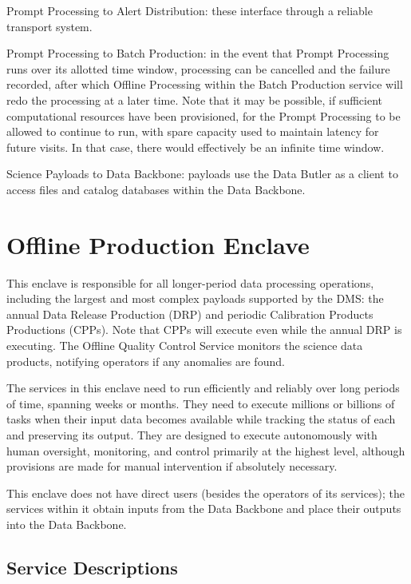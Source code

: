\documentclass[DM,toc,lsstdraft]{lsstdoc}
\begin{document}
Prompt Processing to Alert Distribution: these
interface through a reliable transport system.

Prompt Processing to Batch Production: in the event that Prompt
Processing runs over its allotted time window, processing can be
cancelled and the failure recorded, after which Offline Processing within
the Batch Production service will
redo the processing at a later time. Note that it may be possible, if
sufficient computational resources have been provisioned, for the Prompt
Processing to be allowed to continue to run, with spare capacity used to
maintain latency for future visits. In that case, there would
effectively be an infinite time window.

Science Payloads to Data Backbone: payloads use the Data Butler as a
client to access files and catalog databases within the Data Backbone.

\section{Offline Production Enclave}\label{offline-production-enclave}

This enclave is responsible for all longer-period data processing
operations, including the largest and most complex payloads supported by
the DMS: the annual Data Release Production (DRP) and periodic
Calibration Products Productions (CPPs). Note that CPPs will execute
even while the annual DRP is executing.
 The Offline Quality Control Service monitors the science data
products, notifying operators if any anomalies are found.

The services in this enclave need to run efficiently and reliably over
long periods of time, spanning weeks or months. They need to execute
millions or billions of tasks when their input data becomes available
while tracking the status of each and preserving its output. They are
designed to execute autonomously with human oversight, monitoring, and
control primarily at the highest level, although provisions are made for
manual intervention if absolutely necessary.

This enclave does not have direct users (besides the operators of its
services); the services within it obtain inputs from the Data Backbone
and place their outputs into the Data Backbone.

\subsection{Service Descriptions}\label{ncsa-gen-prod-service-descriptions}
\end{document}
